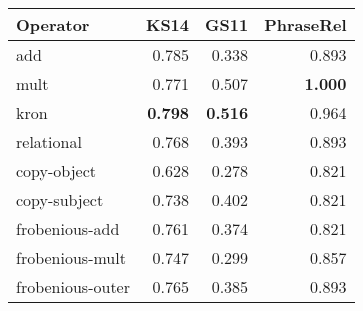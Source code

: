 \begin{tabular}{lrrr}
\toprule
Operator &   KS14 &   GS11 &  PhraseRel \\
\midrule
add              &  0.785 &  0.338 &      0.893 \\
mult             &  0.771 &  0.507 &      \textbf{1.000} \\
kron             &  \textbf{0.798} &  \textbf{0.516} &      0.964 \\
relational       &  0.768 &  0.393 &      0.893 \\
copy-object      &  0.628 &  0.278 &      0.821 \\
copy-subject     &  0.738 &  0.402 &      0.821 \\
frobenious-add   &  0.761 &  0.374 &      0.821 \\
frobenious-mult  &  0.747 &  0.299 &      0.857 \\
frobenious-outer &  0.765 &  0.385 &      0.893 \\
\bottomrule
\end{tabular}
